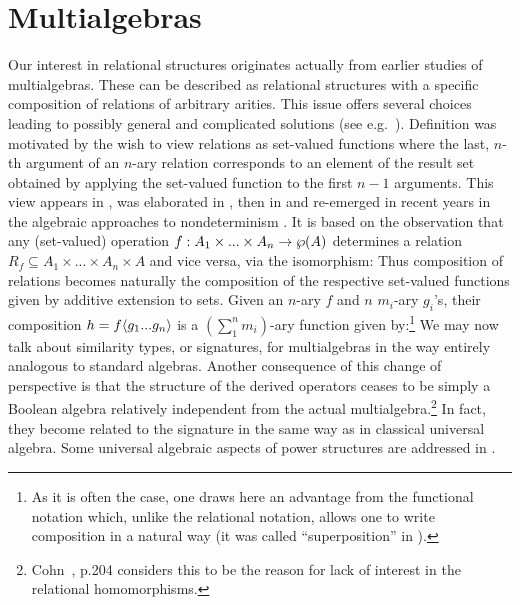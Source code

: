 \documentclass[10pt]{article}
\begin{document}
\section{Multialgebras}
\label{se:mult}
Our interest in relational structures originates actually from earlier studies
of multialgebras. These can be described as relational structures with
a specific composition
of relations of arbitrary arities. This issue offers several
choices leading to possibly general and complicated solutions (see
e.g.\ \cite{glenn,Topen:93}).  Definition  was motivated by
the wish to view relations as set-valued functions where the last,
$n$-th argument of an $n$-ary relation corresponds to an element of
the result set obtained by applying the set-valued function to the first $n-1$
arguments.  This view appears in \cite{c:101}, was elaborated in
\cite{JT1,JT2}, then in \cite{c:102} and re-emerged in recent years in
the algebraic approaches to nondeterminism
\cite{c:64,c:59,c:Bia1,c:130,survey}. 
It is based on the
observation that any (set-valued) operation
$f:A_1\times...\times A_n\rightarrow \wp(A)$ determines a relation
$R_f\subseteq A_1\times...\times A_n\times A$ and vice versa, via the
isomorphism: 
%
%
Thus composition of relations becomes
naturally the composition of the respective set-valued functions given
by additive extension to sets.
Given
an $n$-ary $f$ and $n$ $m_i$-ary $g_i$'s, their composition
$h=f\langle g_1...g_n\rangle$ is a $(\sum_1^n m_i)$-ary function given 
by:\footnote{As it is often the case, one draws here an advantage from
the functional notation which, unlike the relational notation, allows
one to write composition in a natural way (it was called
``superposition'' in \cite{JT1}).}
%
%
We may now talk about similarity types, or signatures, for
multialgebras in the way entirely analogous to standard algebras. 
Another consequence of this change of perspective is 
that the structure of the derived operators ceases to be simply
a Boolean algebra relatively independent from the actual
multialgebra.\footnote{Cohn~\cite{Cohn}, p.204 considers this to be the reason
for lack of interest in the relational homomorphisms.} In fact, they become related to the signature in the
same way as in classical universal algebra.
Some universal algebraic aspects of power structures 
are addressed in \cite{GW84,goldblatt89,brink93, adBrink93, brink97}.
\end{document}

